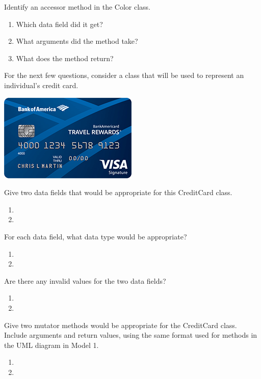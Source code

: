\Q Identify an accessor method in the Color class. 
\begin{enumerate}
\item Which data field did it get?
\item What arguments did the method take?
\item What does the method return?
\end{enumerate}


\vspace{1em}
For the next few questions, consider a class that will be used to represent an individual's credit card.
\begin{center}
\includegraphics{CS1B/credit-card.png}
\end{center}


\Q Give two data fields that would be appropriate for this CreditCard class.

\begin{enumerate}
\item 
\item 
\end{enumerate}


\Q For each data field, what data type would be appropriate?

\begin{enumerate}
\item 
\item 
\end{enumerate}


\Q Are there any invalid values for the two data fields?

\begin{enumerate}
\item 
\item 
\end{enumerate}


\Q Give two mutator methods would be appropriate for the CreditCard class.
Include arguments and return values, using the same format used for methods in the UML diagram in Model 1.

\begin{enumerate}
\item 
\item 
\end{enumerate}
 

